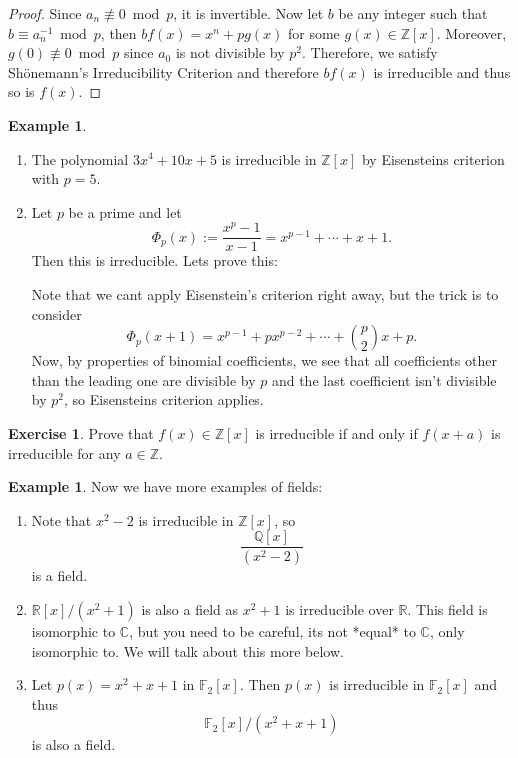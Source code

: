\documentclass[11pt,a4paper]{report}
\theoremstyle{plain}
\theoremstyle{definition}
\newtheorem{exmp}[subsection]{Example}
\theoremstyle{definition}
\newtheorem{question}[subsection]{Exercise}
\newcommand{\ZZ}{\mathbb{Z}}
\newcommand{\RR}{\mathbb{R}}
\def\CC{\mathbb{C}}
\def\FF{\mathbb{F}}
\def\QQ{\mathbb{Q}}
\begin{document}
	\begin{proof}
		Since $a_n \not \equiv 0 \bmod p$, it is invertible. Now let $b$ be any integer such that $b \equiv a_n^{-1} \bmod p$, then $bf(x)=x^n+pg(x)$ for some $g(x) \in \ZZ[x]$. Moreover, $g(0) \not \equiv 0 \bmod p$ since $a_0$ is not divisible by $p^2$. Therefore, we satisfy Sh\"onemann's Irreducibility Criterion and therefore $bf(x)$ is irreducible and thus so is $f(x)$.
	\end{proof}
	
	\begin{exmp}\label{exp: cyclo min pol}
		\begin{enumerate}
			\item The polynomial $3x^4+10x+5$ is irreducible in $\ZZ[x]$ by Eisensteins criterion with $p=5$.
			\item Let $p$ be a prime and let \[\Phi_p(x):=\frac{x^p-1}{x-1}=x^{p-1}+\cdots+x+1.\] Then this is irreducible. Lets prove this:
			
			Note that we cant apply Eisenstein's criterion right away, but the trick is to consider \[\Phi_p(x+1)=x^{p-1}+px^{p-2}+\cdots+\binom{p}{2}x+p.\] Now, by properties of binomial coefficients, we see that all coefficients other than the leading one are divisible by $p$ and the last coefficient isn't divisible by $p^2$, so Eisensteins criterion applies. 
		\end{enumerate}
	\end{exmp}
	
	\begin{question}
		Prove that $f(x) \in \ZZ[x]$ is irreducible if and only if $f(x+a)$ is irreducible for any $a \in \ZZ$.
	\end{question}
	
	
	\begin{exmp}\label{exmp: more fields}
		Now we have more examples of fields:
		\begin{enumerate}
			\item Note that $x^2-2$ is irreducible in $\ZZ[x]$, so \[\frac{\QQ[x]}{(x^2-2)}\] is a field.
			\item $\RR[x]/(x^2+1)$ is also a field as $x^2+1$ is irreducible over $\RR$. This field is isomorphic to $\CC$, but you need to be careful, its not *equal* to $\CC$, only isomorphic to. We will talk about this more below.
			\item Let $p(x)=x^2+x+1$ in $\FF_2[x]$. Then $p(x)$ is irreducible in $\FF_2[x]$ and thus \[\FF_2[x]/(x^2+x+1)\] is also a field.
		\end{enumerate}
	\end{exmp}	
	
\end{document}
